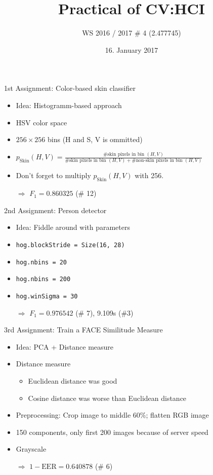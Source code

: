 \documentclass{beamer}
\title{Practical of CV:HCI}
\subtitle{WS 2016 / 2017 \# 4 (2.477745)}
\author[Martin\,Thoma \& Bettina\,Weller\& Yang\,Zhang]
{%
  \texorpdfstring{
    \begin{columns}%
      \column{.30\linewidth}
      \centering
      Martin Thoma\      \href{mailto:info@martin-thoma.de}{info@martin-thoma.de}
      \column{.30\linewidth}
      \centering
      Bettina Weller\    \href{bettinaweller@web.de}{bettinaweller@web.de}
      \column{.30\linewidth}
      \centering
      Yang Zhang\    %
    \end{columns}
  }
  {John Doe \& Jane Doe}
}
\date{16. January 2017}
\begin{document}
\frame{\titlepage}

\begin{frame}{1st Assignment: Color-based skin classifier}
    \begin{itemize}
        \item Idea: Histogramm-based approach
        \item HSV color space
        \item $256 \times 256$ bins (H and S, V is ommitted)
        \item $p_\text{Skin}(H, V) = \frac{\text{\# skin pixels in bin } (H, V)}{\text{\# skin pixels in bin } (H, V) + \text{\# non-skin pixels in bin } (H, V)}$
        \item Don't forget to multiply $p_\text{Skin}(H, V)$ with 256.
        \item[$\Rightarrow$] $F_1 = 0.860325$ (\# 12)
    \end{itemize}
\end{frame}

\begin{frame}{2nd Assignment: Person detector}
    \begin{itemize}
        \item Idea: Fiddle around with parameters
        \item \texttt{hog.blockStride = Size(16, 28)}
        \item \texttt{hog.nbins = 20}
        \item \texttt{hog.nbins = 200}
        \item \texttt{hog.winSigma = 30}
        \item[$\Rightarrow$] $F_1 = 0.976542$ (\# 7), 9.109s (\#3)
    \end{itemize}
\end{frame}

\begin{frame}{3rd Assignment: Train a FACE Similitude Measure}
    \begin{itemize}
        \item Idea: PCA + Distance measure
        \item Distance measure
        \begin{itemize}
            \item Euclidean distance was good
            \item Cosine distance was worse than Euclidean distance
        \end{itemize}
        \item Preprocessing: Crop image to middle 60\%; flatten RGB image
        \item 150 components, only first 200 images because of server speed
        \item Grayscale
        \item[$\Rightarrow$] $1- \text{EER} = 0.640878$ (\# 6)
    \end{itemize}
\end{frame}
\end{document}
